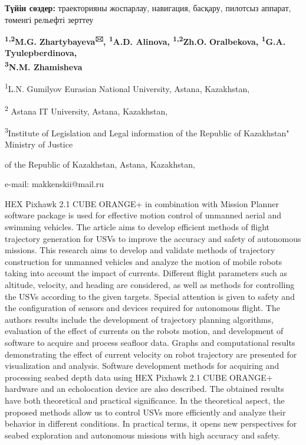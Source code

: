 {\bfseries Түйін сөздер:} траекторияны жоспарлау, навигация, басқару,
пилотсыз аппарат, төменгі рельефті зерттеу


\begin{center}
{\bfseries \textsuperscript{1,2}M.G.}
{\bfseries Zhartybayeva\textsuperscript{🖂}, \textsuperscript{1}A.D.
Alinova, \textsuperscript{1,2}Zh.O.} {\bfseries Oralbekova,
\textsuperscript{1}G.A.} {\bfseries Tyulepberdinova,\\
\textsuperscript{3}N.M. Zhamisheva}

\textsuperscript{1}L.N. Gumilyov Eurasian National University, Astana,
Kazakhstan,

\textsuperscript{2} Astana IT University, Astana, Kazakhstan,

\textsuperscript{3}Institute of Legislation and Legal information of the
Republic of Kazakhstan" Ministry of Justice

of the Republic of Kazakhstan, Astana, Kazakhstan,

e-mail: makkenskii@mail.ru
\end{center}

HEX Pixhawk 2.1 CUBE ORANGE+ in combination with Mission Planner
software package is used for effective motion control of unmanned aerial
and swimming vehicles. The article aims to develop efficient methods of
flight trajectory generation for USVs to improve the accuracy and safety
of autonomous missions. This research aims to develop and validate
methods of trajectory construction for unmanned vehicles and analyze the
motion of mobile robots taking into account the impact of currents.
Different flight parameters such as altitude, velocity, and heading are
considered, as well as methods for controlling the USVs according to the
given targets. Special attention is given to safety and the
configuration of sensors and devices required for autonomous flight. The
author\textquotesingle s results include the development of trajectory
planning algorithms, evaluation of the effect of currents on the
robot\textquotesingle s motion, and development of software to acquire
and process seafloor data. Graphs and computational results
demonstrating the effect of current velocity on robot trajectory are
presented for visualization and analysis. Software development methods
for acquiring and processing seabed depth data using HEX Pixhawk 2.1
CUBE ORANGE+ hardware and an echolocation device are also described. The
obtained results have both theoretical and practical significance. In
the theoretical aspect, the proposed methods allow us to control USVs
more efficiently and analyze their behavior in different conditions. In
practical terms, it opens new perspectives for seabed exploration and
autonomous missions with high accuracy and safety.


